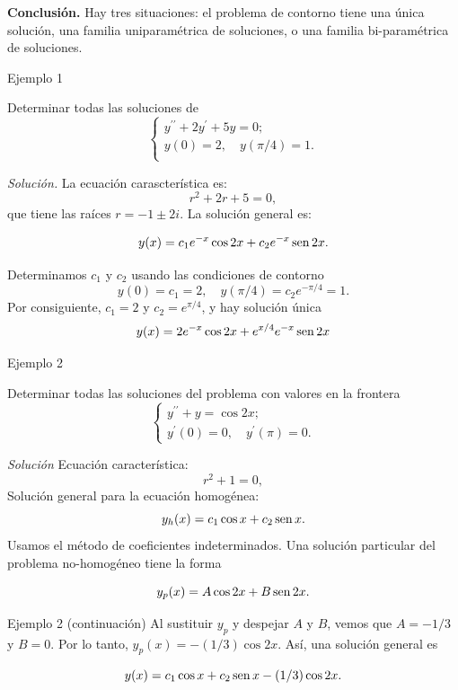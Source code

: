 \textbf{Conclusión.} Hay tres situaciones: el problema de contorno  tiene una única solución, una familia  uniparamétrica de soluciones, o una familia bi-paramétrica de soluciones. 




{Ejemplo 1}

Determinar todas las soluciones de
\[
 \left\{
        \begin{array}{l}
                    y^{\prime \prime}+2 y^{\prime}+5 y=0;\\
                    y(0)=2, \quad y(\pi / 4)=1.\\
        \end{array}
 \right.
\]    


\emph{Solución.} La ecuación carascterística es:
$$r^{2}+2 r+5=0,$$
que tiene las raíces $r=-1 \pm 2 i$. La solución general es:

$$y(x)=c_{1} e^{-x} \cos 2 x+c_{2} e^{-x} \operatorname{sen} 2 x.$$ 

Determinamos $c_{1}$ y $c_{2}$ usando  las condiciones de contorno 
$$
y(0)=c_{1}=2, \quad y(\pi / 4)=c_{2} e^{-\pi / 4}=1 .
$$
Por consiguiente, $c_{1}=2$ y $c_{2}=e^{\pi / 4}$, y hay solución única
$$
y(x)=2 e^{-x} \cos 2 x+e^{x / 4} e^{-x} \operatorname{sen} 2 x
$$





{Ejemplo 2}

  Determinar todas las soluciones del problema con valores en la frontera
\[
 \left\{
        \begin{array}{l}
                     y^{\prime \prime}+y=\cos 2 x;\\
                     y^{\prime}(0)=0, \quad y^{\prime}(\pi)=0.
        \end{array}
 \right.
\]    


\emph{Solución} Ecuación característica: 
                    $$r^{2}+1=0,$$ 
Solución general para la ecuación homogénea:
$$y_{h}(x)=c_{1} \cos x+c_{2} \operatorname{sen} x.$$
Usamos el método de coeficientes indeterminados. Una solución particular del problema no-homogéneo  tiene la forma 

$$y_{p}(x)=A\cos 2 x+B \operatorname{sen} 2 x.$$ 




{Ejemplo 2 (continuación)}
Al sustituir $y_{p}$  y despejar $A$ y $B$, vemos que $A=-1 / 3$ y $B=0$. Por lo tanto, $y_{p}(x)=-(1 / 3) \cos 2 x$. Así, una solución general  es

$$y(x)=c_{1} \cos x+c_{2} \operatorname{sen} x-(1 / 3) \cos 2 x.$$

